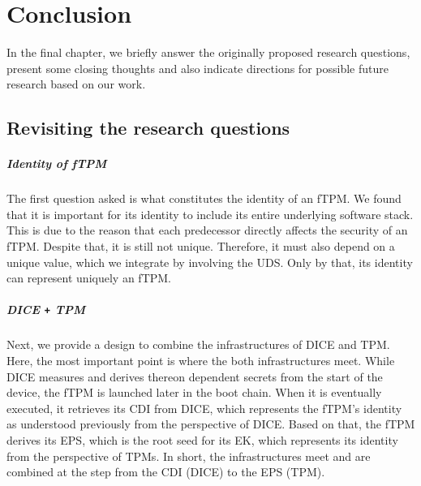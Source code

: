 
\chapter{Conclusion}\label{chapter:future_work_and_conclusion}

In the final chapter, we briefly answer the originally proposed research questions, present some closing thoughts and also indicate directions for possible future research based on our work.

\section{Revisiting the research questions}


\paragraph{Identity of \ac{fTPM}}
The first question asked is what constitutes the identity of an fTPM\@.
We found that it is important for its identity to include its entire underlying software stack.
This is due to the reason that each predecessor directly affects the security of an \ac{fTPM}.
Despite that, it is still not unique.
Therefore, it must also depend on a unique value, which we integrate by involving the \ac{UDS}.
Only by that, its identity can represent uniquely an \ac{fTPM}.

\paragraph{\acs{DICE} \texttt{+} \acs{TPM}}
Next, we provide a design to combine the infrastructures of \ac{DICE} and \ac{TPM}.
Here, the most important point is where the both infrastructures meet.
While \ac{DICE} measures and derives thereon dependent secrets from the start of the device, the \ac{fTPM} is launched later in the boot chain.
When it is eventually executed, it retrieves its \ac{CDI} from \ac{DICE}, which represents the fTPM's identity as understood previously from the perspective of \ac{DICE}.
Based on that, the \ac{fTPM} derives its \ac{EPS}, which is the root seed for its \ac{EK}, which represents its identity from the perspective of \acp{TPM}.
In short, the infrastructures meet and are combined at the step from the \ac{CDI} (DICE) to the \ac{EPS} (TPM).

